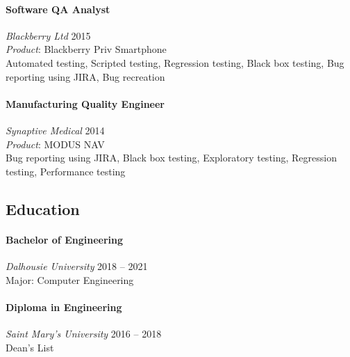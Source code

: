 \documentclass[10pt, twocolumn]{article}
\begin{document}
\paragraph{Software QA Analyst} \emph{Blackberry Ltd} \hfill 2015\\
\emph{Product}: Blackberry Priv Smartphone\\
Automated testing,
Scripted testing,
Regression testing,
Black box testing,
Bug reporting using JIRA,
Bug recreation

\paragraph{Manufacturing Quality Engineer} \emph{Synaptive Medical} \hfill 2014\\
\emph{Product}: MODUS NAV\\
Bug reporting using JIRA,
Black box testing,
Exploratory testing,
Regression testing,
Performance testing


\subsection*{\color{draculapurple}Education}
\paragraph{Bachelor of Engineering} \emph{Dalhousie University} \hfill 2018 -- 2021\\
Major: Computer Engineering

\paragraph{Diploma in Engineering} \emph{Saint Mary's University} \hfill 2016 -- 2018\\
Dean's List

\vfill

\end{document}
